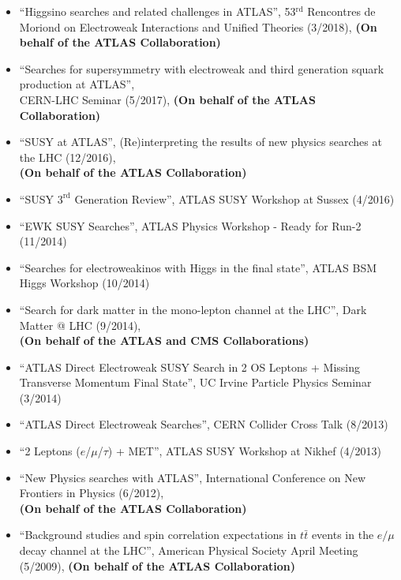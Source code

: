 \documentclass[a4paper,10pt]{article}
\begin{document}
\begin{itemize}
	\item ``Higgsino searches and related challenges in ATLAS'', 53$^{\mathrm{rd}}$ Rencontres de Moriond on Electroweak Interactions and Unified Theories (3/2018), {\bf (On behalf of the ATLAS Collaboration)}
	\item ``Searches for supersymmetry with electroweak and third generation squark production at ATLAS'', \\ CERN-LHC Seminar (5/2017), 
	{\bf (On behalf of the ATLAS Collaboration)}
	\item ``SUSY at ATLAS'', (Re)interpreting the results of new physics searches at the LHC (12/2016),
	\\ {\bf (On behalf of the ATLAS Collaboration)}
	\item ``SUSY $3^{\mathrm{rd}}$ Generation Review'', ATLAS SUSY Workshop at Sussex (4/2016)
	\item ``EWK SUSY Searches'', ATLAS Physics Workshop - Ready for Run-2  (11/2014)
	\item ``Searches for electroweakinos with Higgs in the final state'', ATLAS BSM Higgs Workshop (10/2014)
	\item  ``Search for dark matter in the mono-lepton channel at the LHC'', Dark Matter @ LHC (9/2014), 
	\\ {\bf (On behalf of the ATLAS and CMS Collaborations)}
	\item ``ATLAS Direct Electroweak SUSY Search in 2 OS Leptons + Missing Transverse Momentum Final State'', 
	UC Irvine Particle Physics Seminar (3/2014)
	\item ``ATLAS Direct Electroweak Searches'', CERN Collider Cross Talk (8/2013)
	\item ``2 Leptons ($e$/$\mu$/$\tau$) + MET'', ATLAS SUSY Workshop at Nikhef (4/2013)
	\item ``New Physics searches with ATLAS'', International Conference on New Frontiers in Physics (6/2012),
	\\ {\bf (On behalf of the ATLAS Collaboration)}
	\item ``Background studies and spin correlation expectations in $t\bar{t}$ events in the $e/\mu$ decay channel at the LHC'',
	American Physical Society April Meeting (5/2009), {\bf (On behalf of the ATLAS Collaboration)}
\end{itemize} 
\end{document}
